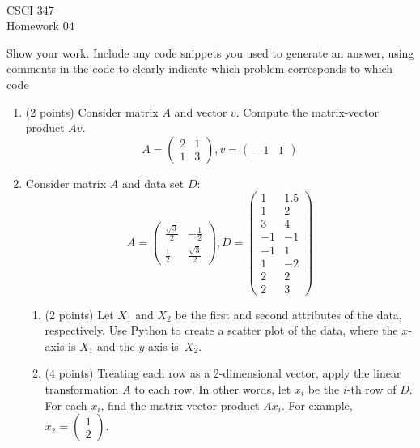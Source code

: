 \documentclass[11pt]{article}
\newcommand{\course}{CSCI 347}
\newcommand{\proj}{Homework 04}
\begin{document}
{ ~\\
    \course \\ 
    \proj \\ 
}

Show your work. Include any code snippets you used to generate an answer, using
comments in the code to clearly indicate which problem corresponds to which code

\begin{enumerate}

    \item (2 points) Consider matrix $A$ and vector $v$.
    Compute the matrix-vector product $Av$.
    $$
        A = \begin{pmatrix} 2 & 1 \\ 1 & 3 \end{pmatrix},
        v = \begin{pmatrix}-1 & 1\end{pmatrix}
    $$

    \item Consider matrix $A$ and data set $D$:
    $$
        A = \begin{pmatrix}
            \frac{\sqrt{3}}{2} & -\frac{1}{2} \\ 
            \frac{1}{2} & \frac{\sqrt{3}}{2}
        \end{pmatrix},
        D = \begin{pmatrix}
            1  &  1.5 \\
            1  &  2 \\
            3  &  4 \\
            -1 &  -1 \\
            -1 &  1 \\
            1  & -2 \\
            2  &  2 \\
            2  & 3
        \end{pmatrix}
    $$

    \begin{enumerate}

        \item (2 points) Let $X_1$ and $X_2$ be the first and second attributes
        of the data, respectively.  Use Python to create a scatter plot of the
        data, where the $x$-axis is $X_1$ and the $y$-axis is~$X_2$.

        \item (4 points) Treating each row as a 2-dimensional vector, apply the
        linear transformation $A$ to each row.  In other words, let $x_i$ be the
        $i$-th row of $D$. For each $x_i$, find the matrix-vector product $A
        x_i$.  For example, $x_2 = \begin{pmatrix} 1 \\  2 \end{pmatrix}$.


\end{enumerate}
\end{enumerate}
\end{document}
